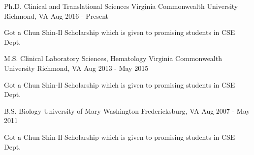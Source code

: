 

\begin{cventries}

\cventry
{Ph.D. Clinical and Translational Sciences} %
{Virginia Commonwealth University} %
{Richmond, VA} %
{Aug 2016 - Present} %
{
  \begin{cvitems} %
    \item {Got a Chun Shin-Il Scholarship which is given to promising students in CSE Dept.}
  \end{cvitems}
}

\cventry
{M.S. Clinical Laboratory Sciences, Hematology} %
{Virginia Commonwealth University} %
{Richmond, VA} %
{Aug 2013 - May 2015} %
{
  \begin{cvitems} %
    \item {Got a Chun Shin-Il Scholarship which is given to promising students in CSE Dept.}
  \end{cvitems}
}

  \cventry
    {B.S. Biology} %
    {University of Mary Washington} %
    {Fredericksburg, VA} %
    {Aug 2007 - May 2011} %
    {
      \begin{cvitems} %
        \item {Got a Chun Shin-Il Scholarship which is given to promising students in CSE Dept.}
      \end{cvitems}
    }


\end{cventries}
